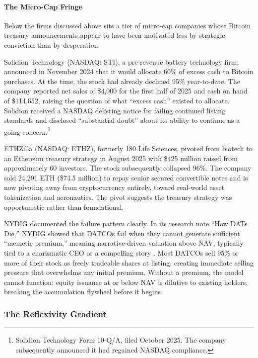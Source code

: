 \paragraph{The Micro-Cap Fringe}

Below the firms discussed above sits a tier of micro-cap companies whose Bitcoin treasury announcements appear to have been motivated less by strategic conviction than by desperation.

Solidion Technology (NASDAQ: STI), a pre-revenue battery technology firm, announced in November 2024 that it would allocate 60\% of excess cash to Bitcoin purchases. At the time, the stock had already declined 95\% year-to-date. The company reported net sales of \$4,000 for the first half of 2025 and cash on hand of \$114,652, raising the question of what ``excess cash'' existed to allocate. Solidion received a NASDAQ delisting notice for failing continued listing standards and disclosed ``substantial doubt'' about its ability to continue as a going concern.\footnote{Solidion Technology Form 10-Q/A, filed October 2025. The company subsequently announced it had regained NASDAQ compliance.}

ETHZilla (NASDAQ: ETHZ), formerly 180 Life Sciences, pivoted from biotech to an Ethereum treasury strategy in August 2025 with \$425 million raised from approximately 60 investors. The stock subsequently collapsed 96\%. The company sold 24,291 ETH (\$74.5 million) to repay senior secured convertible notes and is now pivoting away from cryptocurrency entirely, toward real-world asset tokenization and aeronautics. The pivot suggests the treasury strategy was opportunistic rather than foundational.

NYDIG documented the failure pattern clearly. In its research note ``How DATs Die,'' NYDIG showed that DATCOs fail when they cannot generate sufficient ``memetic premium,'' meaning narrative-driven valuation above NAV, typically tied to a charismatic CEO or a compelling story \citep{nydig2025howdatsdie}. Most DATCOs sell 95\% or more of their stock as freely tradeable shares at listing, creating immediate selling pressure that overwhelms any initial premium. Without a premium, the model cannot function: equity issuance at or below NAV is dilutive to existing holders, breaking the accumulation flywheel before it begins.

\subsubsection{The Reflexivity Gradient}
\label{subsec:reflexivity_gradient}

